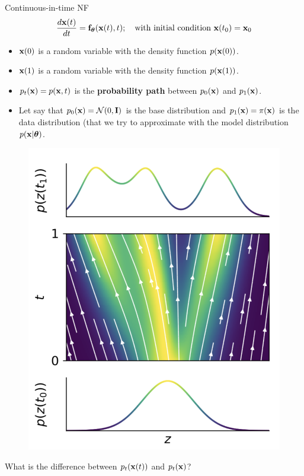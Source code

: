 \begin{frame}{Continuous-in-time NF}
	\vspace{-0.5cm}
	\[
 		\frac{d \mathbf{x}(t)}{dt} = \mathbf{f}_{\boldsymbol{\theta}}(\mathbf{x}(t), t); \quad \text{with initial condition }\mathbf{x}(t_0) = \mathbf{x}_0
	\]
	\vspace{-0.5cm}
	\begin{minipage}[t]{0.6\columnwidth}
		\begin{itemize}
			\item $\mathbf{x}(0)$ is a random variable with the density function $p(\mathbf{x}(0))$.
		 	\item $\mathbf{x}(1)$ is a random variable with the density function $p(\mathbf{x}(1))$.
			\item$p_t(\mathbf{x}) = p(\mathbf{x}, t)$ is the \textbf{probability path} between $p_0(\mathbf{x})$ and $p_1(\mathbf{x})$.
			\item Let say that $p_0(\mathbf{x}) = \mathcal{N}(0, \mathbf{I})$ is the base distribution and $p_1(\mathbf{x}) = \pi(\mathbf{x})$ is the data distribution (that we try to approximate with the model distribution $p(\mathbf{x} | \boldsymbol{\theta})$.
		\end{itemize}
		\vspace{0.2cm}
	\end{minipage}%
	\begin{minipage}[t]{0.4\columnwidth}	
		\begin{figure}
			\centering
			\includegraphics[width=\linewidth]{figs/cnf_flow.png}
		\end{figure}
	\end{minipage}
	{\color{gray}What is the difference between $p_t(\mathbf{x}(t))$ and $p_t(\mathbf{x})$?}
\end{frame}

